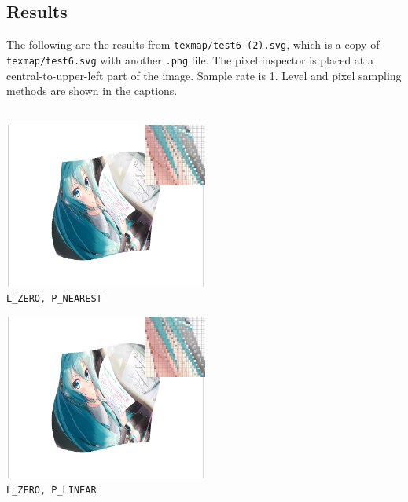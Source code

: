 \documentclass[11pt]{article}
\begin{document}
\subsection{Results}
The following are the results from \verb|texmap/test6 (2).svg|, which is a copy of \verb|texmap/test6.svg| with another \verb|.png| file. The pixel inspector is placed at a central-to-upper-left part of the image. Sample rate is 1. Level and pixel sampling methods are shown in the captions.\\\vspace{3pt}\\
{
    \centering
    \begin{minipage}[htbp]{190pt}
        \centering\includegraphics[width=190pt]{screenshot_2-16_21-23-19.png}\\\verb|L_ZERO, P_NEAREST|
    \end{minipage}
    \begin{minipage}[htbp]{190pt}
        \centering\includegraphics[width=190pt]{screenshot_2-16_21-23-29.png}\\\verb|L_ZERO, P_LINEAR|
    \end{minipage}
}\\
\end{document}

